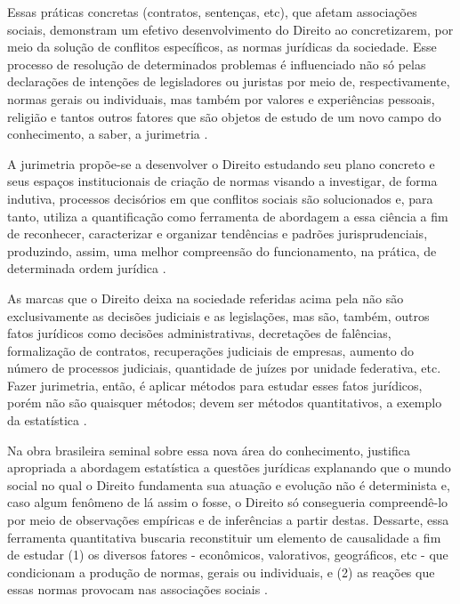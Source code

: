 Essas práticas concretas (contratos, sentenças, etc), que afetam associações sociais, demonstram um efetivo desenvolvimento do Direito ao concretizarem, por meio da solução de conflitos específicos, as normas jurídicas da sociedade. Esse processo de resolução de determinados problemas é influenciado não só pelas declarações de intenções de legisladores ou juristas por meio de, respectivamente, normas gerais ou individuais, mas também por valores e experiências pessoais, religião e tantos outros fatores que são objetos de estudo de um novo campo do conhecimento, a saber, a jurimetria \cite{nunes2016jurimetria}.

A jurimetria propõe-se a desenvolver o Direito estudando seu plano concreto e seus espaços institucionais de criação de normas visando a investigar, de forma indutiva, processos decisórios em que conflitos sociais são solucionados e, para tanto, utiliza a quantificação como ferramenta de abordagem a essa ciência a fim de reconhecer, caracterizar e organizar tendências e padrões jurisprudenciais, produzindo, assim, uma melhor compreensão do funcionamento, na prática, de determinada ordem jurídica \cite{nunes2016jurimetria}.

As marcas que o Direito deixa na sociedade referidas acima pela  não são exclusivamente as decisões judiciais e as legislações, mas são, também, outros fatos jurídicos como decisões administrativas, decretações de falências, formalização de contratos, recuperações judiciais de empresas, aumento do número de processos judiciais, quantidade de juízes por unidade federativa, etc. Fazer jurimetria, então, é aplicar métodos para estudar esses fatos jurídicos, porém não são quaisquer métodos; devem ser métodos quantitativos, a exemplo da estatística \cite{nunes2016jurimetria}.

Na obra brasileira seminal sobre essa nova área do conhecimento,  justifica apropriada a abordagem estatística a questões jurídicas explanando que o mundo social no qual o Direito fundamenta sua atuação e evolução não é determinista e, caso algum fenômeno de lá assim o fosse, o Direito só consegueria compreendê-lo por meio de observações empíricas e de inferências a partir destas. Dessarte, essa ferramenta quantitativa buscaria reconstituir um elemento de causalidade a fim de estudar (1) os diversos fatores - econômicos, valorativos, geográficos, etc - que condicionam a produção de normas, gerais ou individuais, e (2) as reações que essas normas provocam nas associações sociais \cite{nunes2016jurimetria}.


